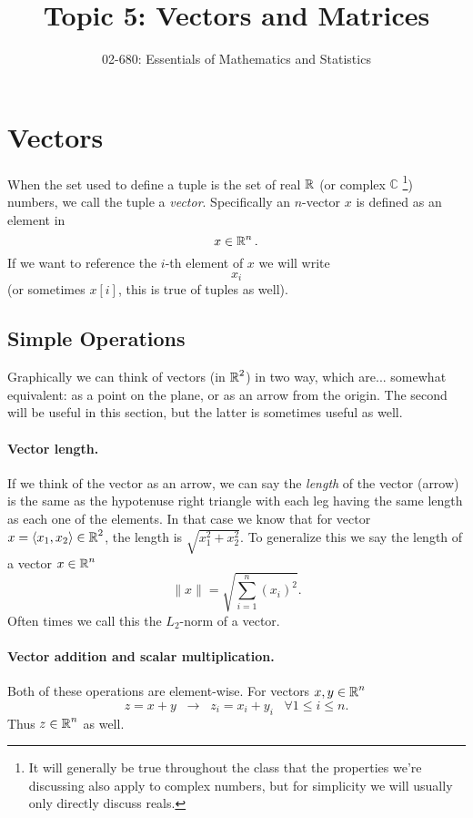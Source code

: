 


\title{Topic 5: Vectors and Matrices}
\author{02-680: Essentials of Mathematics and Statistics}


\maketitle

\section{Vectors}
When the set used to define a tuple is the set of real $\operatorname{\mathbb{R}}$ (or complex $\mathbb{C}$%
\footnote{It will generally be true throughout the class that the properties we're discussing also apply to complex numbers, but for simplicity we will usually only directly discuss reals.})
numbers, we call the tuple a \emph{vector}.
Specifically an $n$-vector $x$ is defined as an element in \[x\in \operatorname{\mathbb{R}}^n.\] 
If we want to reference the $i$-th element of $x$ we will write \[x_i\] (or sometimes $x[i]$, this is true of tuples as well).

\subsection{Simple Operations}
Graphically we can think of vectors (in $\operatorname{\mathbb{R}}^2$) in two way, which are... somewhat equivalent: 
as a point on the plane, or as an arrow from the origin.
The second will be useful in this section, but the latter is sometimes useful as well. 

\paragraph{Vector length.}
If we think of the vector as an arrow, we can say the \emph{length} of the vector (arrow) is the same as the hypotenuse 
right triangle with each leg having the same length as each one of the elements. 
In that case we know that for vector $x = \left\langle x_1,x_2\right\rangle\in\operatorname{\mathbb{R}}^2$, the length is $\sqrt{x_1^2 + x_2^2}$.
To generalize this we say the length of a vector $x\in\operatorname{\mathbb{R}}^n$
\[
\|x\| = \sqrt{\sum_{i=1}^n \left(x_i\right)^2}.
\]
Often times we call this the $L_2$-norm of a vector. 

\paragraph{Vector addition and scalar multiplication.}
Both of these operations are element-wise. 
For vectors $x,y \in \operatorname{\mathbb{R}}^n$
\[
z = x+y \;\;\rightarrow \;\; z_i = x_i + y_i \;\;\; \forall 1 \le i \le n.
\]
Thus $z \in \operatorname{\mathbb{R}}^n$ as well. 

